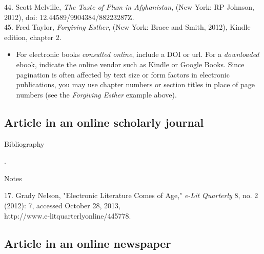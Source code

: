 \begin{singlespace}
\noindent\hspace{1.2cm}44. Scott Melville, \emph{The Taste of Plum in
Afghanistan}, (New York: RP Johnson, 2012), doi: 12.44589/9904384/88223287Z.\\

\noindent\hspace{1.2cm}45. Fred Taylor, \emph{Forgiving Esther}, (New York:
Brace and Smith, 2012), Kindle edition, chapter 2.
\end{singlespace}

\begin{itemize}\item For electronic books \emph{consulted online}, include a DOI
or url. For a \emph{downloaded} ebook, indicate the online vendor such as Kindle
or Google Books. Since pagination is often affected by text size or form factors
in electronic publications, you may use chapter numbers or section titles in
place of page numbers (see the \emph{Forgiving Esther} example
above).\end{itemize}

\subsection{Article in an online scholarly journal}

\begin{center}{Bibliography}\end{center}

\begin{singlespace}
\noindent{}.
\end{singlespace}

\begin{center}{Notes}\end{center} 
\begin{singlespace}
\noindent\hspace{1.2cm}17. Grady Nelson,
"Electronic Literature Comes of Age," \emph{e-Lit Quarterly} 8, no. 2 (2012): 7,
accessed October 28, 2013, \\http://www.e-litquarterlyonline/445778.
\end{singlespace}

\subsection{Article in an online newspaper}

